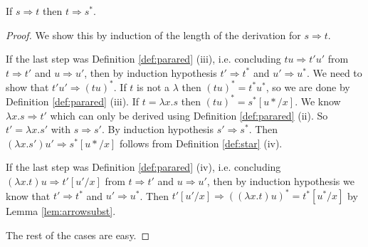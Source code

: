 \begin{boxlem} \label{lem:arrowstar}
    If $s \Rightarrow t$ then $t \Rightarrow s^*$.
\end{boxlem}
\begin{proof}
    We show this by induction of the length of the derivation for $s \Rightarrow t$.

    If the last step was Definition \ref{def:parared} (iii), i.e. concluding $tu \Rightarrow t'u'$ from $t \Rightarrow t'$ and $u \Rightarrow u'$, then by induction hypothesis $t' \Rightarrow t^*$ and $u' \Rightarrow u^*$.
    We need to show that $t'u' \Rightarrow (t u)^*$.
    If $t$ is not a $\lambda$ then $(tu)^* = t^*u^*$, so we are done by Definition \ref{def:parared} (iii).
    If $t = \lambda x. s$ then $(tu)^* = s^* [u*/x]$.
    We know $\lambda x.s \Rightarrow t'$ which can only be derived using Definition \ref{def:parared} (ii).
    So $t' = \lambda x. s'$ with $s \Rightarrow s'$.
    By induction hypothesis $s' \Rightarrow s^*$.
    Then $(\lambda x. s') u' \Rightarrow s^* [u*/x]$ follows from Definition \ref{def:star} (iv).

    If the last step was Definition \ref{def:parared} (iv), i.e. concluding $(\lambda x.t) u \Rightarrow t'[u'/x]$ from $t \Rightarrow t'$ and $u \Rightarrow u'$, then by induction hypothesis we know that $t' \Rightarrow t^*$ and $u' \Rightarrow u^*$.
    Then $t'[u'/x] \Rightarrow ((\lambda x.t)u)^* = t^*[u^* /x]$ by Lemma \ref{lem:arrowsubst}.

    The rest of the cases are easy.
\end{proof}

